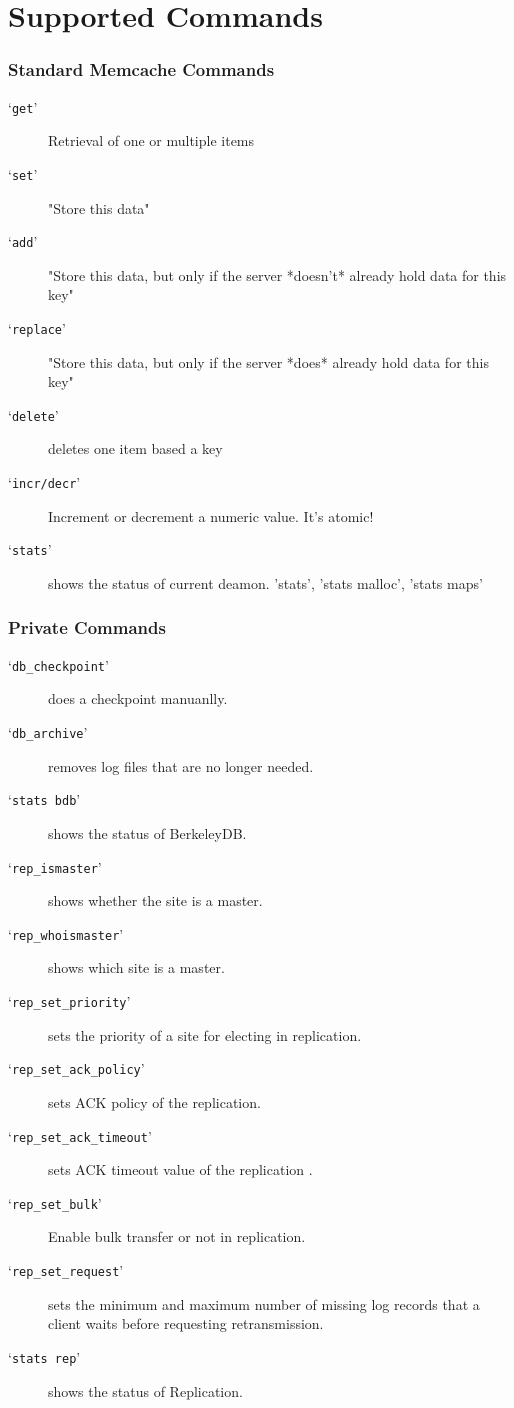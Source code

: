 \documentclass{beamer}
\newcommand{\command}[1]{`\texttt{#1}'}
\newcommand{\mysection}[1]{\section{#1}\frame{\frametitle{#1}\tableofcontents[sectionstyle=show/shaded,subsectionstyle=show/shaded/shaded]}}
\begin{document}
\mysection{Supported Commands}
\begin{frame}
\frametitle{Standard Memcache Commands}
\begin{description}
\item[\command{get}]
  Retrieval of one or multiple items
\item[\command{set}]
  "Store this data"
\item[\command{add}]
  "Store this data, but only if the server *doesn't* already
  hold data for this key"
\item[\command{replace}]
  "Store this data, but only if the server *does*
  already hold data for this key"
\item[\command{delete}]
  deletes one item based a key
\item[\command{incr/decr}]
  Increment or decrement a numeric value. It's atomic!
\item[\command{stats}]
  shows the status of current deamon. 'stats', 'stats malloc', 'stats maps'
\end{description}
\end{frame}

\begin{frame}
\frametitle{Private Commands}
\begin{description}
\item[\command{db\_checkpoint}]
  does a checkpoint manuanlly.
\item[\command{db\_archive}]
  removes log files that are no longer needed.
\item[\command{stats bdb}]
  shows the status of BerkeleyDB.
\item[\command{rep\_ismaster}]
  shows whether the site is a master.
\item[\command{rep\_whoismaster}]
  shows which site is a master.
\item[\command{rep\_set\_priority}]
  sets the priority of a site for electing in replication.
\item[\command{rep\_set\_ack\_policy}]
  sets ACK policy of the replication.
\item[\command{rep\_set\_ack\_timeout}]
  sets ACK timeout value of the replication .
\item[\command{rep\_set\_bulk}]
  Enable bulk transfer or not in replication.
\item[\command{rep\_set\_request}]
  sets the minimum and maximum number of missing log records that a client waits before requesting retransmission.
\item[\command{stats rep}]
  shows the status of Replication.
\end{description}
\end{frame}
\end{document}
